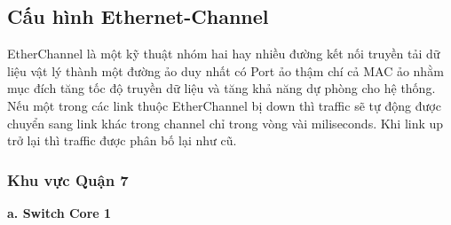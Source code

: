 \documentclass[a4paper, 12pt]{article}
\begin{document}
\subsection{Cấu hình Ethernet-Channel}
\hspace*{1cm}EtherChannel là một kỹ thuật nhóm hai hay nhiều đường kết nối truyền tải dữ liệu vật lý thành một đường ảo duy nhất có Port ảo thậm chí cả MAC ảo nhằm mục đích tăng tốc độ truyền dữ liệu và tăng khả năng dự phòng cho hệ thống. Nếu một trong các link thuộc EtherChannel bị down thì traffic sẽ tự động được chuyển sang link khác trong channel chỉ trong vòng vài miliseconds. Khi link up trở lại thì traffic được phân bố lại như cũ.\\
\subsubsection{Khu vực Quận 7}
\hspace*{1cm}\textbf{a. Switch Core 1}\\
\end{document}
